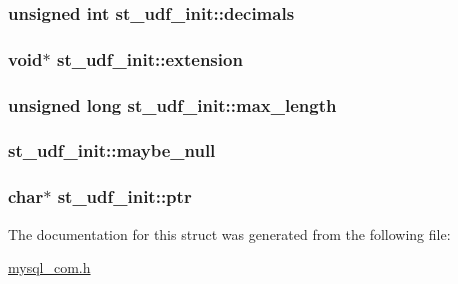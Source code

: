 \subsubsection[{decimals}]{\setlength{\rightskip}{0pt plus 5cm}unsigned int st\+\_\+udf\+\_\+init\+::decimals}\label{structst__udf__init_aca2f114c18f57900974f81ae62a5543a}
\hypertarget{structst__udf__init_ab2cbc7921ecfcf5e714e2099599a371d}{}
\subsubsection[{extension}]{\setlength{\rightskip}{0pt plus 5cm}void$\ast$ st\+\_\+udf\+\_\+init\+::extension}\label{structst__udf__init_ab2cbc7921ecfcf5e714e2099599a371d}
\hypertarget{structst__udf__init_a60d9ca1caa23f0c5328403d1e9c607d7}{}
\subsubsection[{max\+\_\+length}]{\setlength{\rightskip}{0pt plus 5cm}unsigned long st\+\_\+udf\+\_\+init\+::max\+\_\+length}\label{structst__udf__init_a60d9ca1caa23f0c5328403d1e9c607d7}
\hypertarget{structst__udf__init_a71054469fdef17b80268a94562318060}{}
\subsubsection[{maybe\+\_\+null}]{ st\+\_\+udf\+\_\+init\+::maybe\+\_\+null}\label{structst__udf__init_a71054469fdef17b80268a94562318060}
\hypertarget{structst__udf__init_a9fb5360f7a0f4b9e952024161ced16b5}{}
\subsubsection[{ptr}]{\setlength{\rightskip}{0pt plus 5cm}char$\ast$ st\+\_\+udf\+\_\+init\+::ptr}\label{structst__udf__init_a9fb5360f7a0f4b9e952024161ced16b5}


The documentation for this struct was generated from the following file\+:\begin{DoxyCompactItemize}
\item 
\hyperlink{mysql__com_8h}{mysql\+\_\+com.\+h}\end{DoxyCompactItemize}

